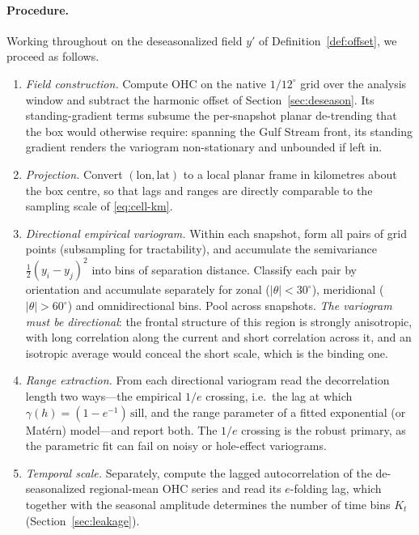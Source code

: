 \paragraph{Procedure.} Working throughout on the deseasonalized field
$y'$ of Definition~\ref{def:offset}, we proceed as follows.
\begin{enumerate}
\item \emph{Field construction.} Compute OHC on the native
  $1/12^\circ$ grid over the analysis window and subtract the harmonic
  offset of Section~\ref{sec:deseason}. Its standing-gradient terms
  subsume the per-snapshot planar de-trending that the box would
  otherwise require: spanning the Gulf Stream front, its standing
  gradient renders the variogram non-stationary and unbounded if left
  in.
\item \emph{Projection.} Convert $(\mathrm{lon},\mathrm{lat})$ to a local
  planar frame in kilometres about the box centre, so that lags and
  ranges are directly comparable to the sampling scale of
  \eqref{eq:cell-km}.
\item \emph{Directional empirical variogram.} Within each snapshot, form
  all pairs of grid points (subsampling for tractability), and accumulate
  the semivariance $\tfrac12(y_i-y_j)^2$ into bins of separation
  distance. Classify each pair by orientation and accumulate separately
  for zonal ($|\theta|<30^\circ$), meridional ($|\theta|>60^\circ$) and
  omnidirectional bins. Pool across snapshots. \emph{The variogram must
  be directional}: the frontal structure of this region is strongly
  anisotropic, with long correlation along the current and short
  correlation across it, and an isotropic average would conceal the
  short scale, which is the binding one.
\item \emph{Range extraction.} From each directional variogram read the
  decorrelation length two ways---the empirical $1/e$ crossing, i.e.\ the
  lag at which $\gamma(h)=(1-e^{-1})\,\mathrm{sill}$, and the range
  parameter of a fitted exponential (or Mat\'ern) model---and report
  both. The $1/e$ crossing is the robust primary, as the parametric fit
  can fail on noisy or hole-effect variograms.
\item \emph{Temporal scale.} Separately, compute the lagged
  autocorrelation of the de-seasonalized regional-mean OHC series and
  read its $e$-folding lag, which together with the seasonal amplitude
  determines the number of time bins $K_t$
  (Section~\ref{sec:leakage}).
\end{enumerate}

